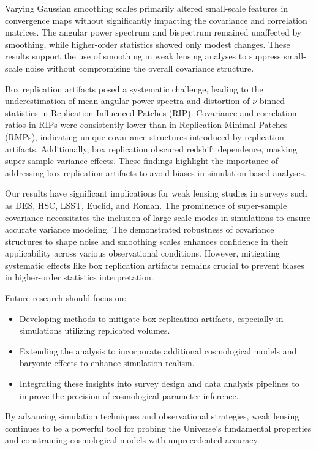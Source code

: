 Varying Gaussian smoothing scales primarily altered small-scale features in convergence maps without significantly impacting the covariance and correlation matrices. The angular power spectrum and bispectrum remained unaffected by smoothing, while higher-order statistics showed only modest changes. These results support the use of smoothing in weak lensing analyses to suppress small-scale noise without compromising the overall covariance structure.

Box replication artifacts posed a systematic challenge, leading to the underestimation of mean angular power spectra and distortion of $\nu$-binned statistics in Replication-Influenced Patches (RIP). Covariance and correlation ratios in RIPs were consistently lower than in Replication-Minimal Patches (RMPs), indicating unique covariance structures introduced by replication artifacts. Additionally, box replication obscured redshift dependence, masking super-sample variance effects. These findings highlight the importance of addressing box replication artifacts to avoid biases in simulation-based analyses.

Our results have significant implications for weak lensing studies in surveys such as DES, HSC, LSST, Euclid, and Roman. The prominence of super-sample covariance necessitates the inclusion of large-scale modes in simulations to ensure accurate variance modeling. The demonstrated robustness of covariance structures to shape noise and smoothing scales enhances confidence in their applicability across various observational conditions. However, mitigating systematic effects like box replication artifacts remains crucial to prevent biases in higher-order statistics interpretation.

Future research should focus on:
\begin{itemize}
    \item Developing methods to mitigate box replication artifacts, especially in simulations utilizing replicated volumes.
    \item Extending the analysis to incorporate additional cosmological models and baryonic effects to enhance simulation realism.
    \item Integrating these insights into survey design and data analysis pipelines to improve the precision of cosmological parameter inference.
\end{itemize}

By advancing simulation techniques and observational strategies, weak lensing continues to be a powerful tool for probing the Universe's fundamental properties and constraining cosmological models with unprecedented accuracy.